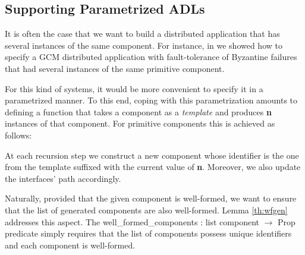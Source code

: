 \subsection{Supporting Parametrized ADLs}
\label{subsub:paramadl}

	It is often the case that we want to build a distributed application that has several
	instances of the same \textsf{component}. For instance, in \cite{BHHM:FACS11} we showed
	how to specify a \ac{GCM} distributed application with fault-tolerance of Byzantine 
	failures \cite{Lamport:1982:BGP:357172.357176} that had
	several instances of the same primitive \textsf{component}.
	
	For this kind of systems, it would be more convenient to specify it in a parametrized
	manner. To this end, coping 
	with this parametrization amounts to defining a function that takes a \textsf{component}
	as a \textit{template} and produces \textbf{n} instances of that  \textsf{component}. For primitive
	 \textsf{component}s this is achieved as follows:
	
		

	\noindent At each recursion step we construct a new  \textsf{component}
	whose identifier is the one from the template suffixed with the
	current value of \textbf{n}. Moreover, we also update the \textsf{interface}s' 
	\textsf{path} accordingly.
	
	Naturally, provided that the given \textsf{component} is well-formed, we want
	to ensure that the list of generated \textsf{component}s are also well-formed.
	Lemma \ref{th:wfgen} addresses this aspect.	The \textsf{well\_formed\_components : list component $\rightarrow$ Prop}
	predicate simply requires that the list of \textsf{component}s possess unique identifiers
	and each \textsf{component} is well-formed.
		
